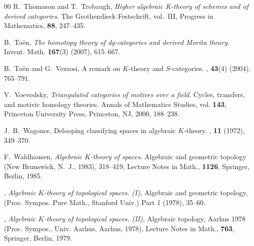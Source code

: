 \documentclass{amsart}
\numberwithin{equation}{section}
\theoremstyle{definition}
\begin{document}
\begin{thebibliography}{00}
 R.~Thomason and T.~Trobaugh, {\em Higher algebraic
  {K}-theory of schemes and of derived categories}. The Grothendieck
  Festschrift, vol.~III, Progress in Mathematics, {\bf 88}, 247--435.

 B.~To{\"e}n, {\em The homotopy theory of {dg}-categories and
    derived Morita theory}. Invent. Math. {\bf 167}(3) (2007),
    615--667.

B.~To{\"e}n and G.~Vezzosi,
\newblock A remark on {$K$}-theory and {$S$}-categories.
, {\bf 43}(4) (2004), 765--791.

 V.~Voevodsky, {\em Triangulated categories of
  motives over a field}. Cycles, transfers, and motivic homology
  theories. Annals of Mathematics Studies, vol. {\bf 143}, Princeton
  University Press, Princeton, NJ, 2000, 188--238.

 J.~B.~Wagoner,
\newblock Delooping classifying spaces in algebraic {$K$}-theory.
, {\bf 11} (1972), 349--370.

 F.~Waldhausen, {\em Algebraic $K$-theory of spaces}.
  Algebraic and geometric topology (New Brunswick, N.~J., 1983),
  318--419, Lecture Notes in Math., {\bf 1126}, Springer, Berlin,
  1985.

 \bysame, {\em Algebraic $K$-theory of topological
  spaces. (I)}, Algebraic and geometric topology, (Proc. Sympos. Pure
  Math., Stanford Univ.) Part 1 (1978), 35--60.

 \bysame, {\em Algebraic $K$-theory of topological spaces.
  (II)}, Algebraic topology, Aarhus 1978 (Proc. Sympos., Univ. Aarhus,
  Aarhus, 1978), Lecture Notes in Math., {\bf 763}, Springer, Berlin, 1979.

\end{thebibliography}
\end{document}
